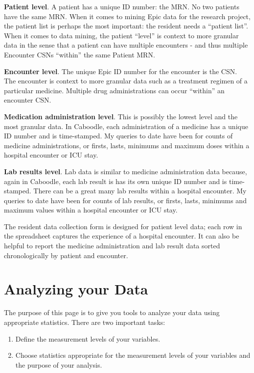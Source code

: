 \documentclass[
  letterpaper,
  DIV=11,
  numbers=noendperiod]{scrreprt}
\providecommand{\tightlist}{%
  \setlength{\itemsep}{0pt}\setlength{\parskip}{0pt}}\usepackage{longtable,booktabs,array}
\begin{document}
\textbf{Patient level}. A patient has a unique ID number: the MRN. No
two patients have the same MRN. When it comes to mining Epic data for
the research project, the patient list is perhaps the most important:
the resident needs a ``patient list''. When it comes to data mining, the
patient ``level'' is context to more granular data in the sense that a
patient can have multiple encounters - and thus multiple Encounter CSNs
``within'' the same Patient MRN.

\textbf{Encounter level}. The unique Epic ID number for the encounter is
the CSN. The encounter is context to more granular data such as a
treatment regimen of a particular medicine. Multiple drug
administrations can occur ``within'' an encounter CSN.

\textbf{Medication administration level}. This is possibly the lowest
level and the most granular data. In Caboodle, each administration of a
medicine has a unique ID number and is time-stamped. My queries to date
have been for counts of medicine administrations, or firsts, lasts,
minimums and maximum doses within a hospital encounter or ICU stay.

\textbf{Lab results level}. Lab data is similar to medicine
administration data because, again in Caboodle, each lab result is has
its own unique ID number and is time-stamped. There can be a great many
lab results within a hospital encounter. My queries to date have been
for counts of lab results, or firsts, lasts, minimums and maximum values
within a hospital encounter or ICU stay.

The resident data collection form is designed for patient level data;
each row in the spreadsheet captures the experience of a hospital
encounter. It can also be helpful to report the medicine administration
and lab result data sorted chronologically by patient and encounter.


\hypertarget{analyzing-your-data}{%
\chapter*{Analyzing your Data}\label{analyzing-your-data}}

The purpose of this page is to give you tools to analyze your data using
appropriate statistics. There are two important tasks:

\begin{enumerate}
\def\labelenumi{\arabic{enumi}.}
\tightlist
\item
  Define the measurement levels of your variables.
\item
  Choose statistics appropriate for the measurement levels of your
  variables and the purpose of your analysis.
\end{enumerate}
\end{document}
